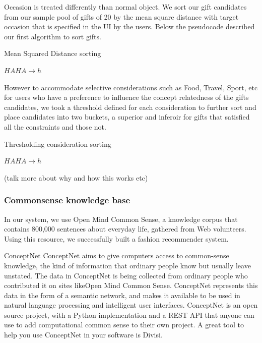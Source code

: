 \documentclass[11pt,twocolumn]{article}
\begin{document}
Occasion is treated differently than normal object. We sort our gift candidates from our sample pool of gifts of 20 by the mean square distance with target occasion that is specified in the UI by the users. Below the pseudocode described our first algorithm to sort gifts.

\begin{algorithm}
\caption{Mean Squared Distance sorting}
\label{mse}
\begin{algorithmic}
\STATE $HAHA \rightarrow h$
\end{algorithmic}
\end{algorithm}


However to accommodate selective considerations such as Food, Travel, Sport, etc for users who have a preference to influence the concept relatedness of the gifts candidates, we took a threshold defined for each consideration to further sort and place candidates into two buckets, a superior and inferoir for gifts that satisfied all the constraints and those not.

\begin{algorithm}
\caption{Thresholding consideration sorting}
\label{tcs}
\begin{algorithmic}
\STATE $HAHA \rightarrow h$
\end{algorithmic}
\end{algorithm}

(talk more about why and how this works etc)


\subsubsection{Commonsense knowledge base}
In our system, we use Open Mind Common Sense, a knowledge corpus that contains 800,000 sentences about everyday life, gathered from Web volunteers. Using this resource, we successfully built a fashion recommender system.

{\large ConceptNet}
ConceptNet aims to give computers access to common-sense knowledge, the kind of information that ordinary people know but usually leave unstated.
The data in ConceptNet is being collected from ordinary people who contributed it on sites likeOpen Mind Common Sense. ConceptNet represents this data in the form of a semantic network, and makes it available to be used in natural language processing and intelligent user interfaces.
ConceptNet is an open source project, with a Python implementation and a REST API that anyone can use to add computational common sense to their own project. A great tool to help you use ConceptNet in your software is Divisi.
\end{document}
